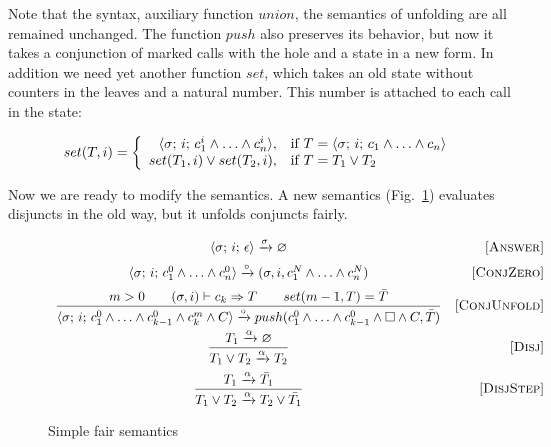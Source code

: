 Note that the syntax, auxiliary function $union$, the semantics of unfolding are all remained unchanged. The function $push$ also preserves its behavior, but now it takes a conjunction of marked
calls with the hole and a state in a new form. In addition we need yet another function $set$, which takes an old state without counters in the leaves and a natural number. This number is
attached to each call in the state:

\[
set(T, i) =
\left\{
\begin{array}{rl}
\langle \sigma;\, i;\, c_1^i \land \ldots \land c_n^i \rangle, & \mbox{if } T = \langle \sigma;\, i;\, c_1 \land \ldots \land c_n \rangle \\
set(T_1, i) \lor set(T_2, i), & \mbox{if } T = T_1 \lor T_2
\end{array}
\right.
\]

Now we are ready to modify the semantics. A new semantics (Fig.~\ref{fair:naive-semantics}) evaluates disjuncts in the old way,
but it unfolds conjuncts fairly.

\begin{figure}[h!]
\[\begin{array}{cr}

      {\langle \sigma;\, i;\, \epsilon \rangle \xrightarrow{\sigma} \varnothing}  
&     \mbox{[\textsc{Answer}]} \\[2mm]
      {\langle \sigma;\, i;\, c_1^0 \land \ldots \land c_n^0 \rangle \xrightarrow{\circ} (\sigma, i, c_1^N \land \ldots \land c_n^N)}
&     \mbox{[\textsc{ConjZero}]} \\[2mm]
\dfrac{m > 0 \qquad (\sigma, i) \vdash c_k \Rightarrow T \qquad set(m - 1, T) = \bar{T}}
      {\langle \sigma;\, i;\, c_1^0 \land \ldots \land c_{k-1}^0 \land c_k^m \land C \rangle \xrightarrow{\circ} push(c_1^0 \land \ldots \land c_{k-1}^0 \land \Box \land C, \bar{T})}
&     \mbox{[\textsc{ConjUnfold}]} \\[4mm]
\dfrac{T_1 \xrightarrow{\alpha} \varnothing}
      {T_1 \lor T_2 \xrightarrow{\alpha} T_2}
&     \mbox{[\textsc{Disj}]} \\[4mm]
\dfrac{T_1 \xrightarrow{\alpha} \bar{T_1}}
      {T_1 \lor T_2 \xrightarrow{\alpha} T_2 \lor\bar{T_1}}
&     \mbox{[\textsc{DisjStep}]}
\end{array}\]
\caption{Simple fair semantics}
\label{fair:naive-semantics}
\end{figure}

